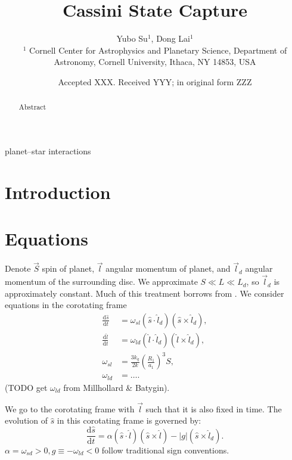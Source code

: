 \documentclass[
        fleqn,
        usenatbib,
    ]{mnras}
\title[Cassini State Capture]{Cassini State Capture}
\author[Y. Su et\ al.]{
Yubo Su$^1$,
Dong Lai$^1$
\\
$^1$ Cornell Center for Astrophysics and Planetary Science, Department of
Astronomy, Cornell University, Ithaca, NY 14853, USA
}
\date{Accepted XXX\@. Received YYY\@; in original form ZZZ}
\newcommand*{\rd}[2]{\frac{\mathrm{d}#1}{\mathrm{d}#2}}
\newcommand*{\abs}[1]{\left|#1\right|}
\newcommand*{\p}[1]{\left(#1\right)}
\begin{document}
\label{firstpage}
\pagerange{\pageref{firstpage}--\pageref{lastpage}}
\renewcommand*{\sectionautorefname}{Section}
\maketitle


\begin{abstract}
    Abstract
\end{abstract}

\begin{keywords}
planet--star interactions %
\end{keywords}

\section{Introduction}

\section{Equations}\label{s:eq}

Denote $\vec{S}$ spin of planet, $\vec{l}$ angular momentum of planet, and
$\vec{l}_d$ angular momentum of the surrounding disc. We approximate $S \ll L
\ll L_d$, so $\vec{l}_d$ is approximately constant. Much of this treatment
borrows from \citep{anderson2018teeter}. We consider equations in the corotating
frame
\begin{align}
    \rd{\hat{s}}{t} &= \omega_{sl} \p{\hat{s} \cdot \hat{l}_d}
        \p{\hat{s} \times \hat{l}_d},\\
    \rd{\hat{l}}{t} &= \omega_{ld}\p{\hat{l} \cdot \hat{l}_d}
        \p{\hat{l} \times \hat{l}_d},\\
    \omega_{sl} &= \frac{3k_q}{2k}\p{\frac{R_1}{a_1}}^3S,\\
    \omega_{ld} &= \dots.
\end{align}
(TODO get $\omega_{ld}$ from Millhollard \& Batygin).

We go to the corotating frame with $\vec{l}$ such that it is also fixed in time.
The evolution of $\hat{s}$ in this corotating frame is governed by:
\begin{equation}
    \rd{\hat{s}}{t} = \alpha \p{\hat{s} \cdot \hat{l}}
            \p{\hat{s} \times \hat{l}}
        - \abs{g}\p{\hat{s} \times \hat{l}_d}.
        \label{eq:dsdt_base}
\end{equation}
$\alpha = \omega_{sd} > 0, g \equiv -\omega_{ld}< 0$ follow traditional sign
conventions.
\end{document}
